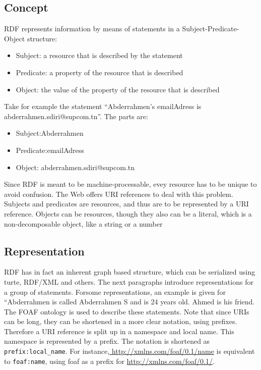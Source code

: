 \documentclass[a4paper,12pt,oneside]{report}
\begin{document}
{\subsection{Concept}
{RDF represents information by means of statements in a Subject-Predicate-Object structure:
\begin{itemize}
\item {Subject: a resource that is described by the statement}
\item {Predicate: a property of the resource that is described}
\item {Object: the value of the property of the resource that is described}
\end{itemize}
{Take for example the statement “Abderrahmen's emailAdress is abderrahmen.sdiri@supcom.tn”. The parts are:
\begin{itemize}
\item {Subject:Abderrahmen }
\item {Predicate:emailAdress}
\item {Object: abderrahmen.sdiri@supcom.tn}
\end{itemize}
{Since RDF is meant to be machine-processable, evey resource has to be unique to avoid confusion. The Web offers URI references to deal with this problem. Subjects and predicates are resources, and thus are to be represented by a URI reference. Objects can be resources, though they also can be a literal, which is a non-decomposable object, like a string or a number}
\subsection{Representation}
{RDF has in fact an inherent graph based structure, which can be serialized using turte, RDF/XML and others. The next paragraphs introduce representations for a group of statements. Forsome representations, an example is given for “Abderrahmen is called Abderrahmen S and is 24 years old. Ahmed is his friend. The FOAF  ontology is used to describe these statements. Note that since URIs can be long, they can be shortened in a more clear notation, using prefixes. Therefore a URI reference is split up in a namespace and local name.
This namespace is represented by a prefix. The notation is shortened as  \verb!prefix:local_name!. For instance,\url{ http://xmlns.com/foaf/0.1/name}  is  equivalent to \verb!foaf:name!, using foaf as a prefix for  \url{http://xmlns.com/foaf/0.1/}.}
}}}
\end{document}
